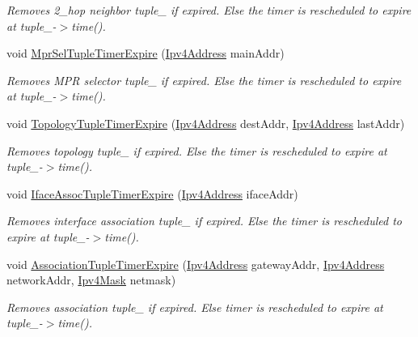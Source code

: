 \begin{DoxyCompactItemize}
\begin{DoxyCompactList}\small\item\em Removes 2\+\_\+hop neighbor tuple\+\_\+ if expired. Else the timer is rescheduled to expire at tuple\+\_\+-\/$>$time(). \end{DoxyCompactList}\item 
void \hyperlink{classns3_1_1olsr_1_1RoutingProtocol_a47272f0889e3c50e4fe26f1f4d9fb3fe}{Mpr\+Sel\+Tuple\+Timer\+Expire} (\hyperlink{classns3_1_1Ipv4Address}{Ipv4\+Address} main\+Addr)
\begin{DoxyCompactList}\small\item\em Removes M\+PR selector tuple\+\_\+ if expired. Else the timer is rescheduled to expire at tuple\+\_\+-\/$>$time(). \end{DoxyCompactList}\item 
void \hyperlink{classns3_1_1olsr_1_1RoutingProtocol_a9200f9b5d45ca2eacf92027ca0355182}{Topology\+Tuple\+Timer\+Expire} (\hyperlink{classns3_1_1Ipv4Address}{Ipv4\+Address} dest\+Addr, \hyperlink{classns3_1_1Ipv4Address}{Ipv4\+Address} last\+Addr)
\begin{DoxyCompactList}\small\item\em Removes topology tuple\+\_\+ if expired. Else the timer is rescheduled to expire at tuple\+\_\+-\/$>$time(). \end{DoxyCompactList}\item 
void \hyperlink{classns3_1_1olsr_1_1RoutingProtocol_af93aa9d349c1be0aef8401d2e4189d4c}{Iface\+Assoc\+Tuple\+Timer\+Expire} (\hyperlink{classns3_1_1Ipv4Address}{Ipv4\+Address} iface\+Addr)
\begin{DoxyCompactList}\small\item\em Removes interface association tuple\+\_\+ if expired. Else the timer is rescheduled to expire at tuple\+\_\+-\/$>$time(). \end{DoxyCompactList}\item 
void \hyperlink{classns3_1_1olsr_1_1RoutingProtocol_a60b5814cf05807e207ac9ebe1f6d90b6}{Association\+Tuple\+Timer\+Expire} (\hyperlink{classns3_1_1Ipv4Address}{Ipv4\+Address} gateway\+Addr, \hyperlink{classns3_1_1Ipv4Address}{Ipv4\+Address} network\+Addr, \hyperlink{classns3_1_1Ipv4Mask}{Ipv4\+Mask} netmask)
\begin{DoxyCompactList}\small\item\em Removes association tuple\+\_\+ if expired. Else timer is rescheduled to expire at tuple\+\_\+-\/$>$time(). \end{DoxyCompactList}\item 

\end{DoxyCompactItemize}
